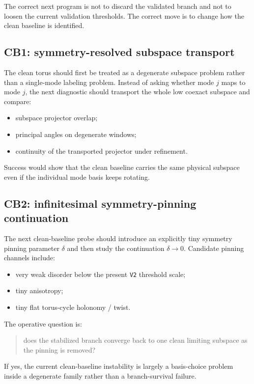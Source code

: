 \documentclass[11pt]{article}
\begin{document}
The correct next program is not to discard the validated branch and not to loosen the current validation thresholds. The correct move is to change how the clean baseline is identified.

\subsection{CB1: symmetry-resolved subspace transport}

The clean torus should first be treated as a degenerate subspace problem rather than a single-mode labeling problem. Instead of asking whether mode \(j\) maps to mode \(j\), the next diagnostic should transport the whole low coexact subspace and compare:
\begin{itemize}
\item subspace projector overlap;
\item principal angles on degenerate windows;
\item continuity of the transported projector under refinement.
\end{itemize}

Success would show that the clean baseline carries the same physical subspace even if the individual mode basis keeps rotating.

\subsection{CB2: infinitesimal symmetry-pinning continuation}

The next clean-baseline probe should introduce an explicitly tiny symmetry pinning parameter \(\delta\) and then study the continuation \(\delta \to 0\). Candidate pinning channels include:
\begin{itemize}
\item very weak disorder below the present \texttt{V2} threshold scale;
\item tiny anisotropy;
\item tiny flat torus-cycle holonomy / twist.
\end{itemize}

The operative question is:
\begin{quote}
does the stabilized branch converge back to one clean limiting subspace as the pinning is removed?
\end{quote}

If yes, the current clean-baseline instability is largely a basis-choice problem inside a degenerate family rather than a branch-survival failure.
\end{document}
